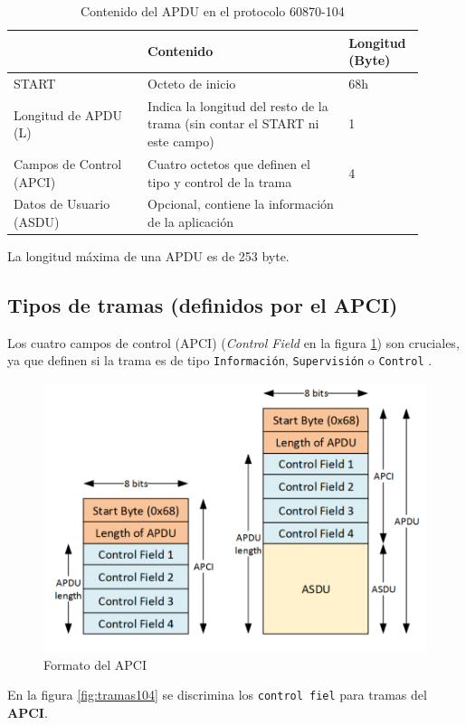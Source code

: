 \documentclass[a5paper]{book}%
\begin{document}
\begin{table}[H]
	\centering
	\caption{Contenido del APDU en el protocolo 60870-104}
\begin{tabular}{|p{0.3\linewidth}|p{0.45\linewidth}|p{0.15\linewidth}|}
  \hline
\rowcolor{black} \color{white}{Campo}&\color{white}Contenido& \color{white}Longitud (Byte)\\\hline
START&	Octeto de inicio&68h\\\hline		
Longitud de APDU (L)&Indica la longitud del resto de la trama (sin contar el START ni este campo)&1\\\hline
Campos de Control (APCI)	&Cuatro octetos que definen el tipo y control de la trama&	4\\\hline		
Datos de Usuario (ASDU)&Opcional, contiene la información de la aplicación& \\\hline
  \end{tabular}
\end{table}

  La longitud máxima de una APDU es de 253 byte.

  \subsection{Tipos de tramas (definidos por el APCI)}


  Los cuatro campos de control (APCI) (\textit{Control Field} en la figura \ref{fig:cabecera104})  son cruciales, ya que definen si la trama es de tipo \texttt{Información}, \texttt{Supervisión} o \texttt{Control} \cite{GOMEZ2019}.
  
  
\begin{figure}[H]
  	\centering
  	\caption{Formato del APCI}
  	\label{fig:cabecera104}
  	\includegraphics[width=0.7\linewidth]{cabecera_104}
\end{figure}

En la figura \ref{fig:tramas104} se discrimina los \texttt{control fiel} para tramas  del \textbf{APCI}.
  
\end{document}
